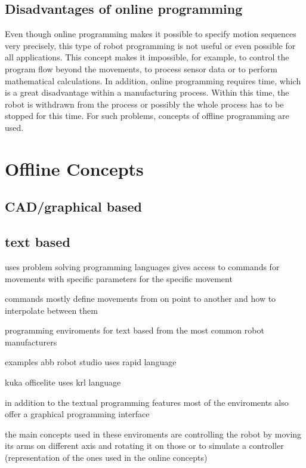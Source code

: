 \documentclass[conference]{IEEEtran}
\begin{document}
    \subsection{Disadvantages of online programming}
    Even though online programming makes it possible to specify motion sequences very precisely, this type of robot programming is not useful or even possible for all applications. This concept makes it impossible, for example, to control the program flow beyond the movements, to process sensor data or to perform mathematical calculations. In addition, online programming requires time, which is a great disadvantage within a manufacturing process. Within this time, the robot is withdrawn from the process or possibly the whole process has to be stopped for this time. For such problems, concepts of offline programming are used. %

\section{Offline Concepts}
    \subsection{CAD/graphical based}
    \subsection{text based}

        uses problem solving programming languages 
        gives access to commands for movements with specific parameters for the specific movement

        commands mostly define movements from on point to another and how to interpolate between them %
        
        programming enviroments for text based from the most common robot manufacturers %
        
        examples 
        abb robot studio
        uses rapid language %

        kuka officelite
        uses krl language %

        in addition to the textual programming features most of the enviroments also offer a graphical programming interface

        the main concepts used in these enviroments are controlling the robot by moving its arms on different axis and rotating it on those or to simulate a controller (representation of the ones used in the online concepts)
\end{document}
